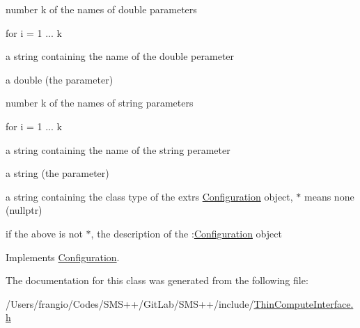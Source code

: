 number k of the names of double parameters

for i = 1 ... k
\begin{DoxyItemize}
\item a string containing the name of the double perameter
\item a double (the parameter)
\end{DoxyItemize}

number k of the names of string parameters

for i = 1 ... k
\begin{DoxyItemize}
\item a string containing the name of the string perameter
\item a string (the parameter)
\end{DoxyItemize}

a string containing the class type of the extrs \mbox{\hyperlink{class_s_m_spp__di__unipi__it_1_1_configuration}{Configuration}} object, \textquotesingle{}$\ast$\textquotesingle{} means none (nullptr)

if the above is not \textquotesingle{}$\ast$\textquotesingle{}, the description of the \+:\mbox{\hyperlink{class_s_m_spp__di__unipi__it_1_1_configuration}{Configuration}} object 

Implements \mbox{\hyperlink{class_s_m_spp__di__unipi__it_1_1_configuration_a27ae9e4279482d52342c7958c34a43c6}{Configuration}}.



The documentation for this class was generated from the following file\+:\begin{DoxyCompactItemize}
\item 
/\+Users/frangio/\+Codes/\+S\+M\+S++/\+Git\+Lab/\+S\+M\+S++/include/\mbox{\hyperlink{_thin_compute_interface_8h}{Thin\+Compute\+Interface.\+h}}\end{DoxyCompactItemize}
